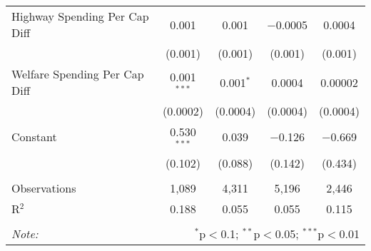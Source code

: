 \begin{table}[!htbp]
\begin{tabular}{@{\extracolsep{5pt}}lcccc}
  Highway Spending Per Cap Diff & 0.001 & 0.001 & $-$0.0005 & 0.0004 \\ 
  & (0.001) & (0.001) & (0.001) & (0.001) \\ 
  Welfare Spending Per Cap Diff & 0.001$^{***}$ & 0.001$^{*}$ & 0.0004 & 0.00002 \\ 
  & (0.0002) & (0.0004) & (0.0004) & (0.0004) \\ 
  Constant & 0.530$^{***}$ & 0.039 & $-$0.126 & $-$0.669 \\ 
  & (0.102) & (0.088) & (0.142) & (0.434) \\ 
 \hline \\[-1.8ex] 
Observations & 1,089 & 4,311 & 5,196 & 2,446 \\ 
R$^{2}$ & 0.188 & 0.055 & 0.055 & 0.115 \\ 
\hline 
\hline \\[-1.8ex] 
\textit{Note:}  & \multicolumn{4}{r}{$^{*}$p$<$0.1; $^{**}$p$<$0.05; $^{***}$p$<$0.01} \\ 
\end{tabular} 
\end{table} 
